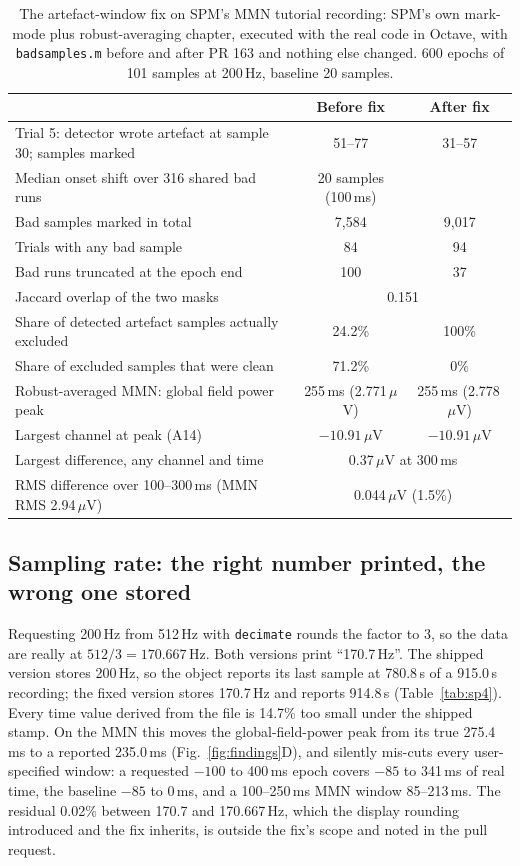 \documentclass[11pt]{article}
\newcommand{\code}[1]{\texttt{#1}}
\begin{document}
\begin{table}[t]
\centering\small
\caption{The artefact-window fix on SPM's MMN tutorial recording: SPM's own mark-mode plus robust-averaging chapter, executed with the real code in Octave, with \code{badsamples.m} before and after PR 163 and nothing else changed. 600 epochs of 101 samples at 200\,Hz, baseline 20 samples.}
\label{tab:sp3}
\begin{tabular}{@{}lcc@{}}
\toprule
 & Before fix & After fix \\
\midrule
Trial 5: detector wrote artefact at sample 30; samples marked & 51--77 & 31--57 \\
Median onset shift over 316 shared bad runs & 20 samples (100\,ms) & \\
Bad samples marked in total & 7{,}584 & 9{,}017 \\
Trials with any bad sample & 84 & 94 \\
Bad runs truncated at the epoch end & 100 & 37 \\
Jaccard overlap of the two masks & \multicolumn{2}{c}{0.151} \\
Share of detected artefact samples actually excluded & 24.2\% & 100\% \\
Share of excluded samples that were clean & 71.2\% & 0\% \\
\midrule
Robust-averaged MMN: global field power peak & 255\,ms (2.771\,$\mu$V) & 255\,ms (2.778\,$\mu$V) \\
Largest channel at peak (A14) & $-10.91\,\mu$V & $-10.91\,\mu$V \\
Largest difference, any channel and time & \multicolumn{2}{c}{0.37\,$\mu$V at 300\,ms} \\
RMS difference over 100--300\,ms (MMN RMS 2.94\,$\mu$V) & \multicolumn{2}{c}{0.044\,$\mu$V (1.5\%)} \\
\bottomrule
\end{tabular}
\end{table}

\subsection{Sampling rate: the right number printed, the wrong one stored}
Requesting 200\,Hz from 512\,Hz with \code{decimate} rounds the factor to 3, so the data are really at $512/3 = 170.667$\,Hz. Both versions print ``170.7\,Hz''. The shipped version stores 200\,Hz, so the object reports its last sample at 780.8\,s of a 915.0\,s recording; the fixed version stores 170.7\,Hz and reports 914.8\,s (Table~\ref{tab:sp4}). Every time value derived from the file is 14.7\% too small under the shipped stamp. On the MMN this moves the global-field-power peak from its true 275.4\,ms to a reported 235.0\,ms (Fig.~\ref{fig:findings}D), and silently mis-cuts every user-specified window: a requested $-100$ to 400\,ms epoch covers $-85$ to 341\,ms of real time, the baseline $-85$ to 0\,ms, and a 100--250\,ms MMN window 85--213\,ms. The residual 0.02\% between 170.7 and 170.667\,Hz, which the display rounding introduced and the fix inherits, is outside the fix's scope and noted in the pull request.
\end{document}
